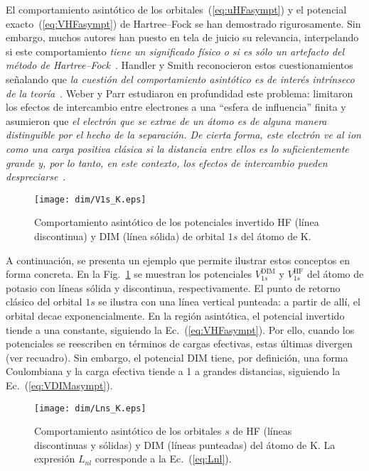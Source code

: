 El comportamiento asintótico de los orbitales~(\ref{eq:uHFasympt}) y el 
potencial exacto~(\ref{eq:VHFasympt}) de Hartree--Fock se han demostrado 
rigurosamente. Sin embargo, muchos autores han puesto en tela de juicio 
su relevancia, interpelando si este comportamiento \textit{tiene un 
significado físico o si es sólo un artefacto del método de 
Hartree--Fock}\myfnote{}~\cite{Handy:69}. Handler y Smith reconocieron 
estos cuestionamientos señalando que \textit{la cuestión del 
comportamiento asintótico es de interés intrínseco de la 
teoría}\myfnote{}~\cite{Handler:80}. Weber y Parr estudiaron en 
profundidad este problema: limitaron los efectos de intercambio entre 
electrones a una ``esfera de influencia'' finita y asumieron que 
\textit{el electrón que se extrae de un átomo es de alguna manera 
distinguible por el hecho de la separación. De cierta 
forma, este electrón ve al ion como una carga positiva clásica si la 
distancia entre ellos es lo suficientemente grande y, por lo tanto, en 
este contexto, los efectos de intercambio pueden 
despreciarse}\myfnote{}~\cite{Weber:71}.

\begin{figure}[t]
\centering
\texttt{[image: dim/V1s\_K.eps]} 
\caption[Comportamiento asintótico de los potenciales.]
{Comportamiento asintótico de los potenciales invertido HF (línea 
discontinua) y DIM (línea sólida) de orbital $1s$ del átomo de K.}
\label{fig:V1sK}
\end{figure}

A continuación, se presenta un ejemplo que permite ilustrar estos 
conceptos en forma concreta. En la Fig.~\ref{fig:V1sK} se muestran los 
potenciales $V_{1s}^{\mathrm{DIM}}$ y $V_{1s}^{\mathrm{HF}}$ del átomo 
de potasio con líneas sólida y discontinua, respectivamente. El punto de 
retorno clásico del orbital $1s$ se ilustra con una línea vertical 
punteada: a partir de allí, el orbital decae exponencialmente. En la 
región asintótica, el potencial invertido tiende a una constante, 
siguiendo la Ec.~(\ref{eq:VHFasympt}). Por ello, cuando los potenciales 
se reescriben en términos de cargas efectivas, estas últimas divergen 
(ver recuadro). Sin embargo, el potencial DIM tiene, por definición, una 
forma Coulombiana y la carga efectiva tiende a 1 a grandes distancias, 
siguiendo la Ec.~(\ref{eq:VDIMasympt}).

\begin{figure}[t]
\centering
\texttt{[image: dim/Lns\_K.eps]} 
\caption[Comportamiento asintótico de los orbitales HF.]
{Comportamiento asintótico de los orbitales $s$ de HF (líneas 
discontinuas y sólidas) y DIM (líneas punteadas) del átomo de K. La 
expresión $L_{nl}$ corresponde a la Ec.~(\ref{eq:Lnl}).}
\label{fig:LnsK}
\end{figure}

